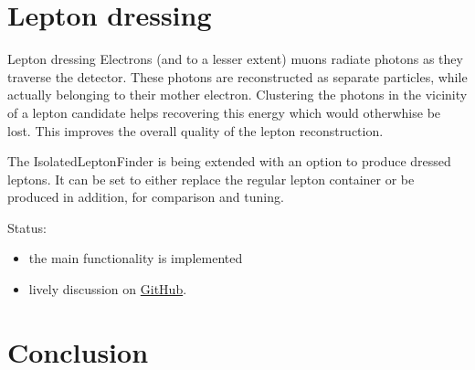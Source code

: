 \documentclass{beamer}
\begin{document}










\section{Lepton dressing}

\begin{frame}{Lepton dressing}
Electrons (and to a lesser extent) muons radiate photons as they traverse the detector. These photons are reconstructed as separate particles, while actually belonging to their mother electron. Clustering the photons in the vicinity of a lepton candidate helps recovering this energy which would otherwhise be lost. This improves the overall quality of the lepton reconstruction.

\vspace{1em}
The IsolatedLeptonFinder is being extended with an option to produce dressed leptons.
It can be set to either replace the regular lepton container or be produced in addition, for comparison and tuning.

\vspace{1em}
Status:
\begin{itemize}
\item the main functionality is implemented
\item lively discussion on \href{https://github.com/iLCSoft/MarlinReco/pull/33}{GitHub}.
\end{itemize}
\end{frame}









\section{Conclusion}
\end{document}

